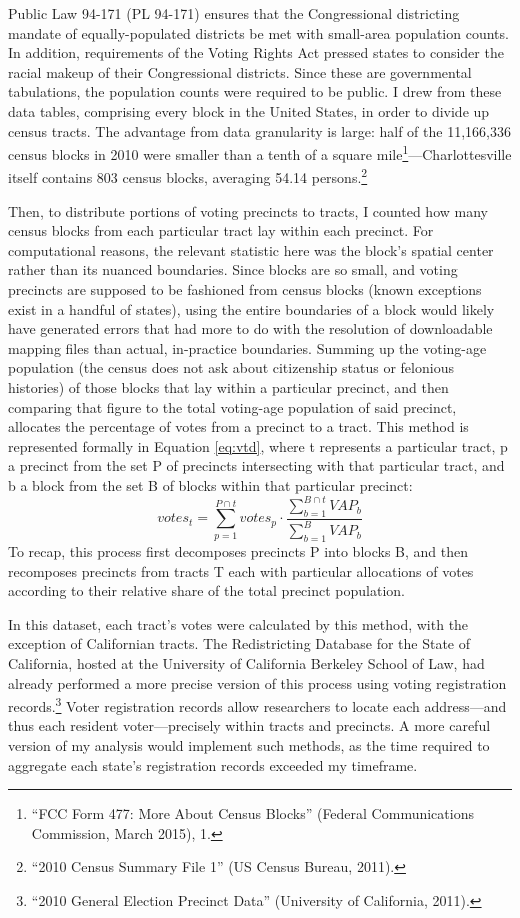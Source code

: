 \documentclass[12pt,oneside]{psthesis}
\begin{document}
Public Law 94-171 (PL 94-171) ensures that the Congressional districting mandate of equally-populated districts be met with small-area population counts.
In addition, requirements of the Voting Rights Act pressed states to consider the racial makeup of their Congressional districts.
Since these are governmental tabulations, the population counts were required to be public.
I drew from these data tables, comprising every block in the United States, in order to divide up census tracts.
The advantage from data granularity is large: half of the 11,166,336 census blocks in 2010 were smaller than a tenth of a square mile\footnote{``FCC Form 477: More About Census Blocks'' (Federal Communications Commission, March 2015), 1.}---Charlottesville itself contains 803 census blocks, averaging 54.14 persons.\footnote{``2010 Census Summary File 1'' (US Census Bureau, 2011).}

Then, to distribute portions of voting precincts to tracts, I counted how many census blocks from each particular tract lay within each precinct.
For computational reasons, the relevant statistic here was the block's spatial center rather than its nuanced boundaries.
Since blocks are so small, and voting precincts are supposed to be fashioned from census blocks (known exceptions exist in a handful of states), using the entire boundaries of a block would likely have generated errors that had more to do with the resolution of downloadable mapping files than actual, in-practice boundaries.
Summing up the voting-age population (the census does not ask about citizenship status or felonious histories) of those blocks that lay within a particular precinct, and then comparing that figure to the total voting-age population of said precinct, allocates the percentage of votes from a precinct to a tract.
This method is represented formally in Equation \eqref{eq:vtd}, where t represents a particular tract, p a precinct from the set P of precincts intersecting with that particular tract, and b a block from the set B of blocks within that particular precinct:
\begin{equation}
votes_{t} = \sum_{p=1}^{P \cap t} votes_p \cdot \frac{\sum_{b=1}^{B \cap t} VAP_b}{\sum_{b=1}^{B} VAP_b}
\label{eq:vtd}
\end{equation}
To recap, this process first decomposes precincts P into blocks B, and then recomposes precincts from tracts T each with particular allocations of votes according to their relative share of the total precinct population.

In this dataset, each tract's votes were calculated by this method, with the exception of Californian tracts.
The Redistricting Database for the State of California, hosted at the University of California Berkeley School of Law, had already performed a more precise version of this process using voting registration records.\footnote{``2010 General Election Precinct Data'' (University of California, 2011).}
Voter registration records allow researchers to locate each address---and thus each resident voter---precisely within tracts and precincts.
A more careful version of my analysis would implement such methods, as the time required to aggregate each state's registration records exceeded my timeframe.
\end{document}
